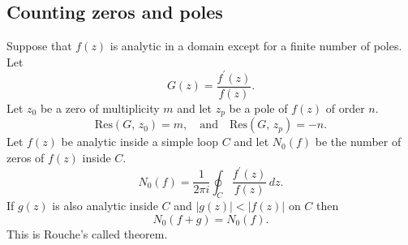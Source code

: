 \documentclass{article}
\begin{document}
\subsection{Counting zeros and poles}
Suppose that $f(z)$ is analytic in a domain except for a finite number of poles. Let
\begin{equation}
    G(z) = \frac{f^\prime(z)}{f(z)}.
\end{equation}
Let $z_0$ be a zero of multiplicity $m$ and let $z_p$ be a pole of $f(z)$ of order $n$.
\begin{equation}
    \text{Res}(G,\,z_0) = m,\quad\text{and}\quad\text{Res}(G,\,z_p) = -n.
\end{equation}
Let $f(z)$ be analytic inside a simple loop $C$ and let $N_0(f)$ be the number of zeros of $f(z)$ inside $C$.
\begin{equation}
    N_0(f) = \frac{1}{2\pi i}\oint_C\frac{f^\prime(z)}{f(z)}\,dz.
\end{equation}
If $g(z)$ is also analytic inside $C$ and $\vert g(z)\vert<\vert f(z)\vert$ on $C$ then
\begin{equation}
    N_0(f+g) = N_0(f).
\end{equation}
This is Rouche's called theorem.
\end{document}
